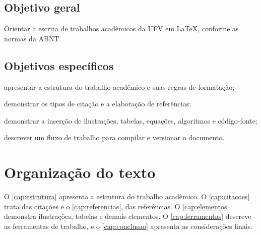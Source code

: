 \subsection{Objetivo geral}\label{sec:objetivo-geral}

Orientar a escrita de trabalhos acadêmicos da UFV em \LaTeX, conforme as normas da ABNT.

\subsection{Objetivos específicos}\label{sec:objetivos-especificos}

\begin{alineas}
	\item apresentar a estrutura do trabalho acadêmico e suas regras de formatação;
	\item demonstrar os tipos de citação e a elaboração de referências;
	\item demonstrar a inserção de ilustrações, tabelas, equações, algoritmos e código-fonte;
	\item descrever um fluxo de trabalho para compilar e versionar o documento.
\end{alineas}

\section{Organização do texto}\label{sec:organizacao}

O \autoref{cap:estrutura} apresenta a estrutura do trabalho acadêmico. O \autoref{cap:citacoes} trata das citações e o \autoref{cap:referencias}, das referências. O \autoref{cap:elementos} demonstra ilustrações, tabelas e demais elementos. O \autoref{cap:ferramentas} descreve as ferramentas de trabalho, e o \autoref{cap:conclusao} apresenta as considerações finais.
